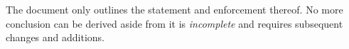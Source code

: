 \documentclass[10pt,a4paper]{article}
\begin{document}
The document only outlines the statement and enforcement thereof. No more conclusion can be derived aside from it is \textit{incomplete} and requires subsequent changes and additions. 



\end{document}
